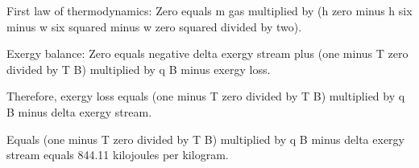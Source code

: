 First law of thermodynamics:  
Zero equals m gas multiplied by (h zero minus h six minus w six squared minus w zero squared divided by two).  

Exergy balance:  
Zero equals negative delta exergy stream plus (one minus T zero divided by T B) multiplied by q B minus exergy loss.  

Therefore, exergy loss equals (one minus T zero divided by T B) multiplied by q B minus delta exergy stream.  

Equals (one minus T zero divided by T B) multiplied by q B minus delta exergy stream equals 844.11 kilojoules per kilogram.